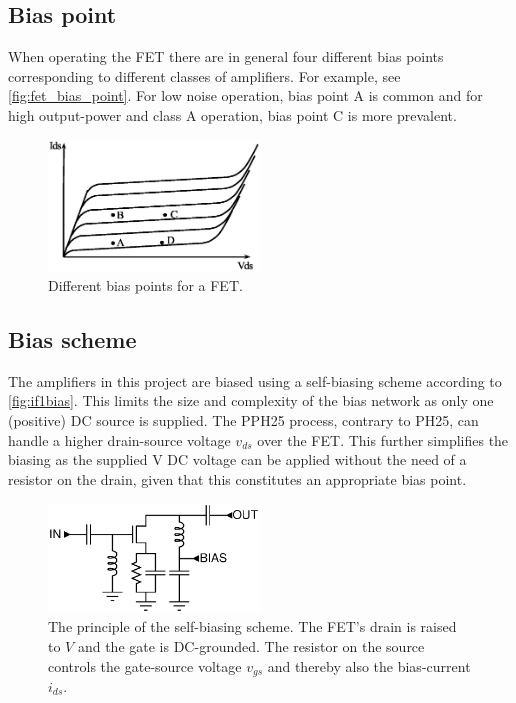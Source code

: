 		\subsection{Bias point}
			When operating the FET there are in general four different bias points corresponding to different classes of amplifiers.\autocite{gonzalez84} For example, see \autoref{fig:fet_bias_point}. For low noise operation, bias point A is common and for high output-power and class A operation, bias point C is more prevalent.
					
			\begin{figure}[hbt!]
				\centering
				\includegraphics[width=0.5\textwidth]{fig/amplifiers/fet_bias_point}
				\caption{Different bias points for a FET.}\label{fig:fet_bias_point}
			\end{figure}
			
		\subsection{Bias scheme}\label{sec:bias}
			The amplifiers in this project are biased using a self-biasing scheme according to \autoref{fig:if1bias}.\autocite{bahl03} This limits the size and complexity of the bias network as only one (positive) DC source is supplied. The PPH25 process, contrary to PH25, can handle a higher drain-source voltage $v_{ds}$ over the FET. This further simplifies the biasing as the supplied \unit[5]{V} DC voltage can be applied without the need of a resistor on the drain, given that this constitutes an appropriate bias point.

			\begin{figure}[hbt!]
				\centering
				\includegraphics[width=0.5\textwidth]{fig/amplifiers/if1/bias}
				\caption[Self-bias scheme.]{The principle of the self-biasing scheme. The FET's drain is raised to $V$ and the gate is DC-grounded. The resistor on the source controls the gate-source voltage $v_{gs}$ and thereby also the bias-current $i_{ds}$.}\label{fig:if1bias}
			\end{figure}

